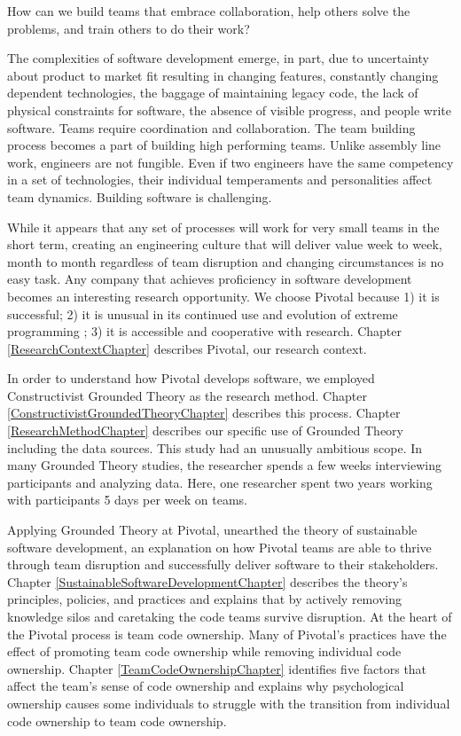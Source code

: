 How can we build teams that embrace collaboration, help others solve the problems, and train others to do their work?


The complexities of software development emerge, in part, due to uncertainty about product to market fit resulting in changing features, constantly changing dependent technologies, the baggage of maintaining legacy code, the lack of physical constraints for software, the absence of visible progress, and people write software. Teams require coordination and collaboration. The team building process becomes a part of building high performing teams. Unlike assembly line work, engineers are not fungible. Even if two engineers have the same competency in a set of technologies, their individual temperaments and personalities affect team dynamics. Building software is challenging. 


While it appears that any set of processes will work for very small teams in the short term, creating an engineering culture that will deliver value week to week, month to month regardless of team disruption and changing circumstances is no easy task. Any company that achieves proficiency in software development becomes an interesting research opportunity. We choose Pivotal because 1) it is successful; 2) it is unusual in its continued use and evolution of extreme programming \cite{BeckExtremeProgramming2004}; 3) it is accessible and cooperative with research. Chapter \ref{ResearchContextChapter} describes Pivotal, our research context. 


In order to understand how Pivotal develops software, we employed Constructivist Grounded Theory as the research method. Chapter \ref{ConstructivistGroundedTheoryChapter} describes this process. Chapter \ref{ResearchMethodChapter} describes our specific use of Grounded Theory including the data sources. This study had an unusually ambitious scope. In many Grounded Theory studies, the researcher spends a few weeks interviewing participants and analyzing data. Here, one researcher spent two years working with participants 5 days per week on \numberOfObservedProjects{} teams. 


Applying Grounded Theory at Pivotal, unearthed the theory of sustainable software development, an explanation on how Pivotal teams are able to thrive through team disruption and successfully deliver software to their stakeholders. Chapter \ref{SustainableSoftwareDevelopmentChapter} describes the theory's principles, policies, and practices and explains that by actively removing knowledge silos and caretaking the code teams survive disruption.  At the heart of the Pivotal process is team code ownership. Many of Pivotal's practices have the effect of promoting team code ownership while removing individual code ownership. Chapter \ref{TeamCodeOwnershipChapter} identifies five factors that affect the team's sense of code ownership and explains why psychological ownership causes
 some individuals to struggle with the transition from individual code ownership to team code ownership. 


